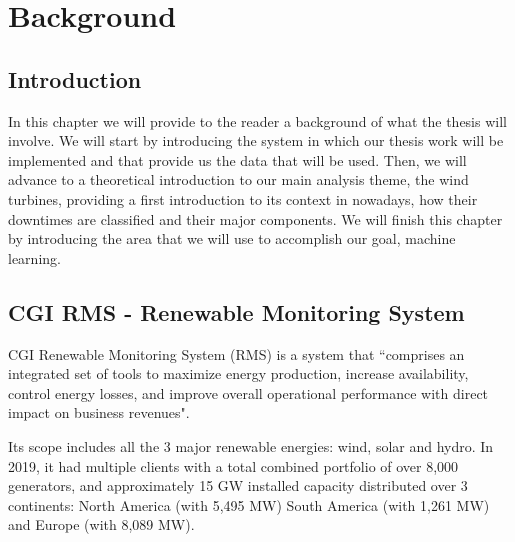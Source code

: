 


\chapter{Background}
\label{cha:background}


\section{Introduction} 
\label{sub:if_you_use_this_template} 

In this chapter we will provide to the reader a background of what the thesis will involve. We will start by introducing the system in which our thesis work will be implemented and that provide us the data that will be used. Then, we will advance to a theoretical introduction to our main analysis theme, the wind turbines, providing a first introduction to its context in nowadays, how their downtimes are classified and their major components. We will finish this chapter by introducing the area that we will use to accomplish our goal, machine learning.

\section{CGI RMS - Renewable Monitoring System} 
\label{sub:if_you_use_this_template} 

CGI Renewable Monitoring System (RMS) is a system that “comprises an integrated set of tools to maximize energy production, increase availability, control energy losses, and improve overall operational performance with direct impact on business revenues".

Its scope includes all the 3 major renewable energies: wind, solar and hydro. In 2019, it had multiple clients with a total combined portfolio of over 8,000 generators, and approximately 15 GW installed capacity distributed over 3 continents: North America (with 5,495 MW) South America (with 1,261 MW) and Europe (with 8,089 MW).

